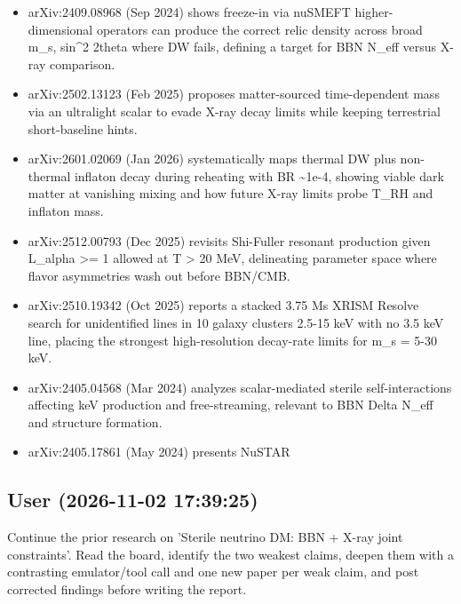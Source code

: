 \documentclass[11pt,a4paper]{article}
\begin{document}
\begin{itemize}
  \item arXiv:2409.08968 (Sep 2024) shows freeze-in via nuSMEFT higher-dimensional operators can produce the correct relic density across broad m\_s, sin\textasciicircum{}2 2theta where DW fails, defining a target for BBN N\_eff versus X-ray comparison.
  \item arXiv:2502.13123 (Feb 2025) proposes matter-sourced time-dependent mass via an ultralight scalar to evade X-ray decay limits while keeping terrestrial short-baseline hints.
  \item arXiv:2601.02069 (Jan 2026) systematically maps thermal DW plus non-thermal inflaton decay during reheating with BR \textasciitilde{}1e-4, showing viable dark matter at vanishing mixing and how future X-ray limits probe T\_RH and inflaton mass.
  \item arXiv:2512.00793 (Dec 2025) revisits Shi-Fuller resonant production given L\_alpha \textgreater{}= 1 allowed at T \textgreater{} 20 MeV, delineating parameter space where flavor asymmetries wash out before BBN/CMB.
  \item arXiv:2510.19342 (Oct 2025) reports a stacked 3.75 Ms XRISM Resolve search for unidentified lines in 10 galaxy clusters 2.5-15 keV with no 3.5 keV line, placing the strongest high-resolution decay-rate limits for m\_s = 5-30 keV.
  \item arXiv:2405.04568 (Mar 2024) analyzes scalar-mediated sterile self-interactions affecting keV production and free-streaming, relevant to BBN Delta N\_eff and structure formation.
  \item arXiv:2405.17861 (May 2024) presents NuSTAR
\end{itemize}
\subsection*{User \small(2026-11-02 17:39:25)}
Continue the prior research on 'Sterile neutrino DM: BBN + X-ray joint constraints'. Read the board, identify the two weakest claims, deepen them with a contrasting emulator/tool call and one new paper per weak claim, and post corrected findings before writing the report.
\end{document}
